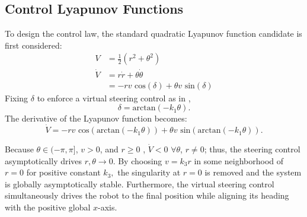 \documentclass[conference]{IEEEtran}
\begin{document}
\subsection{Control Lyapunov Functions}
To design the control law, the standard quadratic Lyapunov function candidate is first considered:
\begin{align}
V&=\frac{1}{2}(r^2+\theta^2)\\
\dot{V}&=r \dot{r}+\theta \dot{\theta}\\
&=-r v \text{ cos}(\delta) + \theta v \text{ sin}(\delta)
\end{align}
Fixing $\delta$ to enforce a virtual steering control as in \cite{park2011}, 
\begin{equation} 
\delta = \text{arctan}(-k_1\theta). \end{equation}
The derivative of the Lyapunov function becomes:
\begin{equation}
\dot{V}=-r v \text{ cos}(\text{arctan}(-k_1\theta)) + \theta v \text{ sin}(\text{arctan}(-k_1\theta)).
\end{equation} 

Because $\theta\in (-\pi,\pi]$, $v>0$, and $r\geq 0$ , $\dot{V}<0$ $\forall \theta$, $r\neq0$; thus, the steering control asymptotically drives $r,\theta\to 0$. By choosing $v=k_3 r$ in some neighborhood of $r=0$ for positive constant $k_3,$ the singularity at $r=0$ is removed and the system is globally asymptotically stable.  Furthermore, the virtual steering control simultaneously drives the robot to the final position while aligning its heading with the positive global $x$-axis. 
\end{document}
